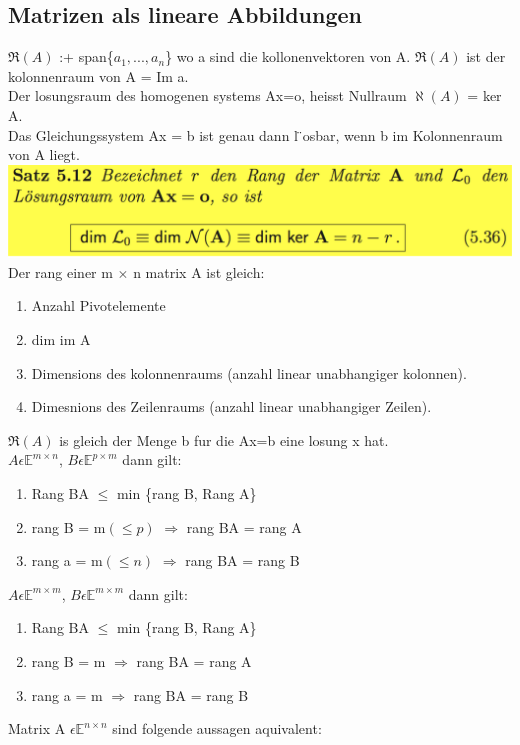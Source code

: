 \documentclass[11pt]{article}
\newcommand\back[1][-3cm]{\hspace*{#1}}
\begin{document}
\subsection{Matrizen als lineare Abbildungen}
$\Re (A)$ :+ span\{$a_1,...,a_n$\} wo a sind die kollonenvektoren von A. $\Re (A)$ ist der kolonnenraum von A = Im a.\\
Der losungsraum des homogenen systems Ax=o, heisst Nullraum $\aleph (A)$ = ker A.\\
Das Gleichungssystem Ax = b ist genau dann l ̈osbar, wenn b im Kolonnenraum von A liegt.\\
\back\includegraphics{images/mat}\\
Der rang einer m $\times$ n matrix A ist gleich:
\begin{enumerate}
	\item Anzahl Pivotelemente
	\item dim im A
	\item Dimensions des kolonnenraums (anzahl linear unabhangiger kolonnen).
	\item Dimesnions des Zeilenraums (anzahl linear unabhangiger Zeilen).
\end{enumerate}
$\Re (A)$ is gleich der Menge b fur die Ax=b eine losung x hat.\\
$A \epsilon \mathbb{E}^{m \times n}$, $B \epsilon \mathbb{E}^{p \times m}$ dann gilt:
\begin{enumerate}
	\item Rang BA $\leq$ min \{rang B, Rang A\}
	\item rang B = m$(\leq p)$ $\Rightarrow$ rang BA = rang A
	\item rang a = m$(\leq n)$ $\Rightarrow$ rang BA = rang B
\end{enumerate} 
$A \epsilon \mathbb{E}^{m \times m}$, $B \epsilon \mathbb{E}^{m \times m}$ dann gilt:
\begin{enumerate}
	\item Rang BA $\leq$ min \{rang B, Rang A\}
	\item rang B = m $\Rightarrow$ rang BA = rang A
	\item rang a = m $\Rightarrow$ rang BA = rang B
\end{enumerate} 
Matrix A $\epsilon \mathbb{E}^{n \times n}$ sind folgende aussagen aquivalent:
\end{document}
